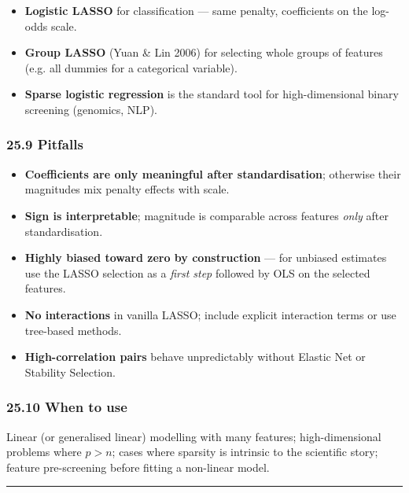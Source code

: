 \documentclass{article}
\providecommand{\tightlist}{\setlength{\itemsep}{0pt}\setlength{\parskip}{0pt}}
\begin{document}
\begin{itemize}
\tightlist
\item
  \textbf{Logistic LASSO} for classification --- same penalty,
  coefficients on the log-odds scale.
\item
  \textbf{Group LASSO} (Yuan \& Lin 2006) for selecting whole groups of
  features (e.g. all dummies for a categorical variable).
\item
  \textbf{Sparse logistic regression} is the standard tool for
  high-dimensional binary screening (genomics, NLP).
\end{itemize}

\subsubsection{25.9 Pitfalls}\label{259-pitfalls}

\begin{itemize}
\tightlist
\item
  \textbf{Coefficients are only meaningful after standardisation};
  otherwise their magnitudes mix penalty effects with scale.
\item
  \textbf{Sign is interpretable}; magnitude is comparable across
  features \emph{only} after standardisation.
\item
  \textbf{Highly biased toward zero by construction} --- for unbiased
  estimates use the LASSO selection as a \emph{first step} followed by
  OLS on the selected features.
\item
  \textbf{No interactions} in vanilla LASSO; include explicit
  interaction terms or use tree-based methods.
\item
  \textbf{High-correlation pairs} behave unpredictably without Elastic
  Net or Stability Selection.
\end{itemize}

\subsubsection{25.10 When to use}\label{2510-when-to-use}

Linear (or generalised linear) modelling with many features;
high-dimensional problems where \(p > n\); cases where sparsity is
intrinsic to the scientific story; feature pre-screening before fitting
a non-linear model.

\begin{center}\rule{0.5\linewidth}{0.5pt}\end{center}
\end{document}
